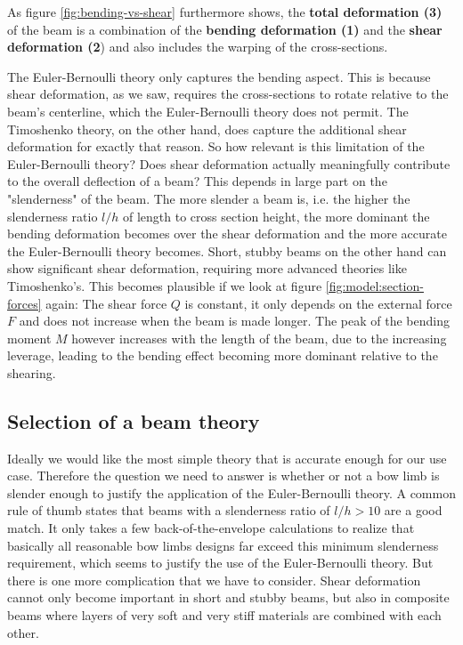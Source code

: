 As figure \ref{fig:bending-vs-shear} furthermore shows, the \textbf{total deformation (3)} of the beam is a combination of the \textbf{bending deformation (1)} and the \textbf{shear deformation (2}) and also includes the warping of the cross-sections.

The Euler-Bernoulli theory only captures the bending aspect.
This is because shear deformation, as we saw, requires the cross-sections to rotate relative to the beam's centerline, which the Euler-Bernoulli theory does not permit.
The Timoshenko theory, on the other hand, does capture the additional shear deformation for exactly that reason.
So how relevant is this limitation of the Euler-Bernoulli theory?
Does shear deformation actually meaningfully contribute to the overall deflection of a beam?
This depends in large part on the "slenderness" of the beam.
The more slender a beam is, i.e. the higher the slenderness ratio $l/h$ of length to cross section height, the more dominant the bending deformation becomes over the shear deformation and the more accurate the Euler-Bernoulli theory becomes.
Short, stubby beams on the other hand can show significant shear deformation, requiring more advanced theories like Timoshenko's.
This becomes plausible if we look at figure \ref{fig:model:section-forces} again: The shear force $Q$ is constant, it only depends on the external force $F$ and does not increase when the beam is made longer.
The peak of the bending moment $M$ however increases with the length of the beam, due to the increasing leverage, leading to the bending effect becoming more dominant relative to the shearing.

\subsection*{Selection of a beam theory}

Ideally we would like the most simple theory that is accurate enough for our use case.
Therefore the question we need to answer is whether or not a bow limb is slender enough to justify the application of the Euler-Bernoulli theory.
A common rule of thumb states that beams with a slenderness ratio of $l/h > 10$ are a good match.
It only takes a few back-of-the-envelope calculations to realize that basically all reasonable bow limbs designs far exceed this minimum slenderness requirement, which seems to justify the use of the Euler-Bernoulli theory.
But there is one more complication that we have to consider.
Shear deformation cannot only become important in short and stubby beams, but also in composite beams where layers of very soft and very stiff materials are combined with each other.

